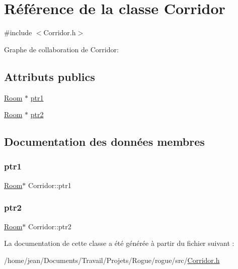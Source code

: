 \hypertarget{classCorridor}{}\section{Référence de la classe Corridor}
\label{classCorridor}


{\ttfamily \#include $<$Corridor.\+h$>$}



Graphe de collaboration de Corridor\+:
\subsection*{Attributs publics}
\begin{DoxyCompactItemize}
\item 
\hyperlink{classRoom}{Room} $\ast$ \hyperlink{classCorridor_a61fe8df2ada35630d4254868d0d7e9b9}{ptr1}
\item 
\hyperlink{classRoom}{Room} $\ast$ \hyperlink{classCorridor_affd2c01f59cd3c136cfc4ae90a63530b}{ptr2}
\end{DoxyCompactItemize}


\subsection{Documentation des données membres}
\mbox{\label{classCorridor_a61fe8df2ada35630d4254868d0d7e9b9}} 
\subsubsection{\texorpdfstring{ptr1}{ptr1}}
{\footnotesize\ttfamily \hyperlink{classRoom}{Room}$\ast$ Corridor\+::ptr1}

\mbox{\label{classCorridor_affd2c01f59cd3c136cfc4ae90a63530b}} 
\subsubsection{\texorpdfstring{ptr2}{ptr2}}
{\footnotesize\ttfamily \hyperlink{classRoom}{Room}$\ast$ Corridor\+::ptr2}



La documentation de cette classe a été générée à partir du fichier suivant \+:\begin{DoxyCompactItemize}
\item 
/home/jean/\+Documents/\+Travail/\+Projets/\+Rogue/rogue/src/\hyperlink{Corridor_8h}{Corridor.\+h}\end{DoxyCompactItemize}
